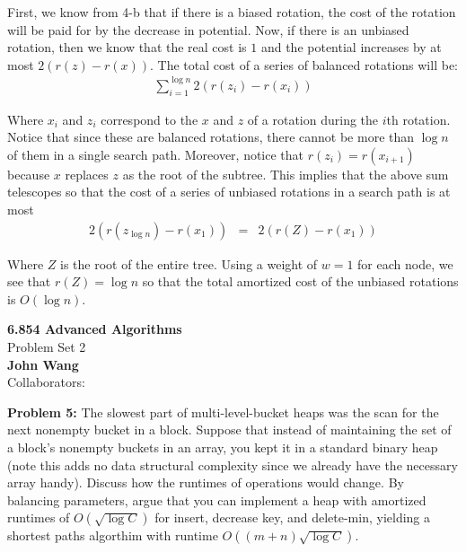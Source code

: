 \documentclass[psamsfonts]{amsart}
\newenvironment{sol}{\vspace{0.25cm}{\large \bfseries Solution:}}{\qedsymbol}
\newenvironment{prob}[1]{\begin{framed}{\large \bfseries Problem #1:}}{\end{framed}}
\newcommand{\makenewtitle}{
\begin{center}
{\huge \bfseries 6.854 Advanced Algorithms} \\
Problem Set 2\\
\vspace{0.25cm}
{\bfseries John Wang} \\
Collaborators:
\end{center}
\vspace{0.5cm}
}
\begin{document}
\begin{sol}
First, we know from 4-b that if there is a biased rotation, the cost of the rotation will be paid for by the decrease in potential. Now, if there is an unbiased rotation, then we know that the real cost is $1$ and the potential increases by at most $2(r(z) - r(x))$. The total cost of a series of balanced rotations will be:
\begin{eqnarray}
\sum_{i=1}^{\log n} 2 ( r(z_i) - r(x_i))
\end{eqnarray}

Where $x_i$ and $z_i$ correspond to the $x$ and $z$ of a rotation during the $i$th rotation. Notice that since these are balanced rotations, there cannot be more than $\log n$ of them in a single search path. Moreover, notice that $r(z_i) = r(x_{i+1})$ because $x$ replaces $z$ as the root of the subtree. This implies that the above sum telescopes so that the cost of a series of unbiased rotations in a search path is at most
\begin{eqnarray}
2(r(z_{\log n}) - r(x_1)) &=& 2(r(Z) - r(x_1))
\end{eqnarray}

Where $Z$ is the root of the entire tree. Using a weight of $w=1$ for each node, we see that $r(Z) = \log n$ so that the total amortized cost of the unbiased rotations is $O(\log n)$.
\end{sol}

\newpage
\makenewtitle

\begin{prob}{5}
The slowest part of multi-level-bucket heaps was the scan for the next nonempty bucket in a block. Suppose that instead of maintaining the set of a block's nonempty buckets in an array, you kept it in a standard binary heap (note this adds no data structural complexity since we already have the necessary array handy). Discuss how the runtimes of operations would change. By balancing parameters, argue that you can implement a heap with amortized runtimes of $O(\sqrt{\log C})$ for insert, decrease key, and delete-min, yielding a shortest paths algorthim with runtime $O((m+n) \sqrt{\log C})$. 
\end{prob}

\begin{sol}

\end{sol}
\end{document}
